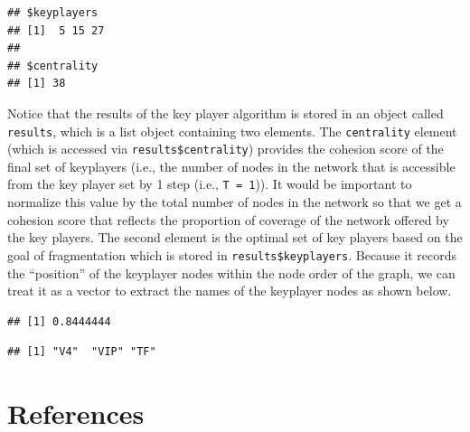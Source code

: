 \documentclass[
]{book}
\newenvironment{Shaded}{\begin{snugshade}}{\end{snugshade}}
\newcommand{\CommentTok}[1]{\textcolor[rgb]{0.56,0.35,0.01}{\textit{#1}}}
\newcommand{\FunctionTok}[1]{\textcolor[rgb]{0.13,0.29,0.53}{\textbf{#1}}}
\newcommand{\NormalTok}[1]{#1}
\newcommand{\SpecialCharTok}[1]{\textcolor[rgb]{0.81,0.36,0.00}{\textbf{#1}}}
\begin{document}
\begin{verbatim}
## $keyplayers
## [1]  5 15 27
## 
## $centrality
## [1] 38
\end{verbatim}

Notice that the results of the key player algorithm is stored in an object called \texttt{results}, which is a list object containing two elements. The \texttt{centrality} element (which is accessed via \texttt{results\$centrality}) provides the cohesion score of the final set of keyplayers (i.e., the number of nodes in the network that is accessible from the key player set by 1 step (i.e., \texttt{T\ =\ 1})). It would be important to normalize this value by the total number of nodes in the network so that we get a cohesion score that reflects the proportion of coverage of the network offered by the key players. The second element is the optimal set of key players based on the goal of fragmentation which is stored in \texttt{results\$keyplayers}. Because it records the ``position'' of the keyplayer nodes within the node order of the graph, we can treat it as a vector to extract the names of the keyplayer nodes as shown below.

\begin{Shaded}
\end{Shaded}

\begin{verbatim}
## [1] 0.8444444
\end{verbatim}

\begin{Shaded}
\end{Shaded}

\begin{verbatim}
## [1] "V4"  "VIP" "TF"
\end{verbatim}

\section{References}\label{references}
\end{document}
